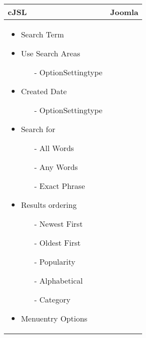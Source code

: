 \begin{minipage}{0.7\textwidth}
\begin{tabular}{|p{} | p{}|}
\hline
\textbf{cJSL} & \textbf{Joomla} \\ 
\hline
\begin{itemize}
 \item Search Term 
 \item Use Search Areas
 \begin{enumerate}
  	\item[-] OptionSettingtype
  \end{enumerate} 
 \item Created Date
 \begin{enumerate}
  	\item[-] OptionSettingtype
  \end{enumerate}
 \item Search for
 \begin{enumerate}
  	\item[-] All Words
  	\item[-] Any Words
  	\item[-] Exact Phrase
  \end{enumerate} 
 \item Results ordering
 \begin{enumerate}
  	\item[-] Newest First
  	\item[-] Oldest First
  	\item[-] Popularity
  	\item[-] Alphabetical
  	\item[-] Category
  \end{enumerate} 
  \item Menuentry Options
 \end{itemize}


\end{tabular}
\end{minipage}
